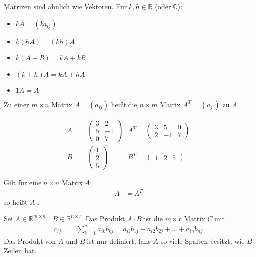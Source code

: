 Matrizen sind ähnlich wie Vektoren. Für $k, h \in \mathbb{R}$ (oder $\mathbb{C}$):
\begin{itemize}
    \item{$kA = (k a_{ij})$}
    \item{$k(hA) = (kh)A$}
    \item{$k(A+B) = kA + kB$}
    \item{$(k+h)A = kA + hA$}
    \item{$1A = A$}
\end{itemize}

Zu einer $m \times n$ Matrix $A = (a_{ij})$ heißt die $n \times m$ Matrix $A^T = (a_{ji})$  zu $A$.

\begin{align*}
    A &= \begin{pmatrix}
        3 & 2 \\
        5 & -1 \\
        0 & 7
    \end{pmatrix} & A^T = \begin{pmatrix}
        3 & 5 & 0 \\
        2 & -1 & 7
    \end{pmatrix} \\
    B &= \begin{pmatrix}
        1 \\
        2 \\
        5
    \end{pmatrix} & B^T = \begin{pmatrix}
        1 & 2 & 5
    \end{pmatrix}
\end{align*}

Gilt für eine $n \times n$ Matrix $A$:
\begin{align*}
    A &= A^T
\end{align*}
so heißt $A$ .

Sei $A \in \mathbb{R}^{m \times n},\enspace B \in \mathbb{R}^{n \times r}$. Das Produkt $A \cdot B$ ist die $m \times r$ Matrix $C$ mit
\begin{align*}
    c_{ij} &= \sum_{k=1}^{n} a_{ik} b_{kj} = a_{i1} b_{1j} + a_{i2} b_{2j} + \dots + a_{in} b_{nj}
\end{align*}
Das Produkt von $A$ und $B$ ist nur definiert, falls $A$ so viele Spalten besitzt, wie $B$ Zeilen hat.

